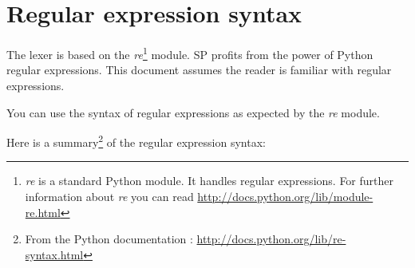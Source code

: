 \section{Regular expression syntax}

The lexer is based on the \emph{re}\footnote{\emph{re} is a standard Python module. It handles regular expressions. For further information about \emph{re} you can read \url{http://docs.python.org/lib/module-re.html}} module.
SP profits from the power of Python regular expressions.
This document assumes the reader is familiar with regular expressions.

You can use the syntax of regular expressions as expected by the \emph{re} module.

Here is a summary\footnote{From the Python documentation : \url{http://docs.python.org/lib/re-syntax.html}} of the regular expression syntax:

